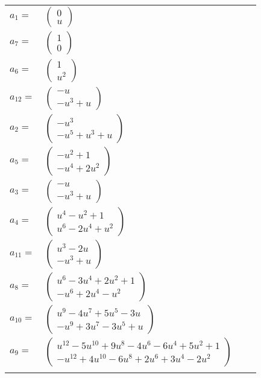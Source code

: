 \documentclass[1p]{elsarticle_modified}
\theoremstyle{definition}
\begin{document}
\begin{tabular}{m{7pt} m{180pt} m{7pt} m{180pt} }
\flushright $a_{1}=$&$\begin{pmatrix}0\\u\end{pmatrix}$ \\
\flushright $a_{7}=$&$\begin{pmatrix}1\\0\end{pmatrix}$ \\
\flushright $a_{6}=$&$\begin{pmatrix}1\\u^2\end{pmatrix}$ \\
\flushright $a_{12}=$&$\begin{pmatrix}- u\\- u^3+u\end{pmatrix}$ \\
\flushright $a_{2}=$&$\begin{pmatrix}- u^3\\- u^5+u^3+u\end{pmatrix}$ \\
\flushright $a_{5}=$&$\begin{pmatrix}- u^2+1\\- u^4+2 u^2\end{pmatrix}$ \\
\flushright $a_{3}=$&$\begin{pmatrix}- u\\- u^3+u\end{pmatrix}$ \\
\flushright $a_{4}=$&$\begin{pmatrix}u^4- u^2+1\\u^6-2 u^4+u^2\end{pmatrix}$ \\
\flushright $a_{11}=$&$\begin{pmatrix}u^3-2 u\\- u^3+u\end{pmatrix}$ \\
\flushright $a_{8}=$&$\begin{pmatrix}u^6-3 u^4+2 u^2+1\\- u^6+2 u^4- u^2\end{pmatrix}$ \\
\flushright $a_{10}=$&$\begin{pmatrix}u^9-4 u^7+5 u^5-3 u\\- u^9+3 u^7-3 u^5+u\end{pmatrix}$ \\
\flushright $a_{9}=$&$\begin{pmatrix}u^{12}-5 u^{10}+9 u^8-4 u^6-6 u^4+5 u^2+1\\- u^{12}+4 u^{10}-6 u^8+2 u^6+3 u^4-2 u^2\end{pmatrix}$\\&\end{tabular}
\end{document}
